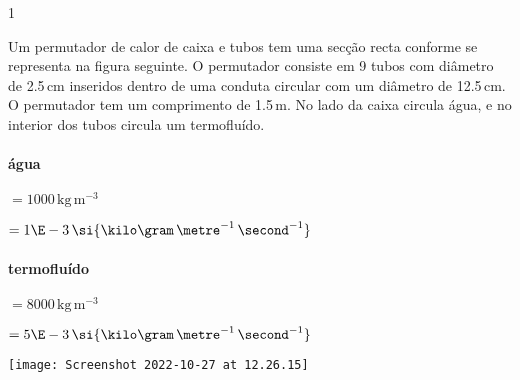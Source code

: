 \documentclass[\mainfilename]{subfiles}
\begin{document}
\begin{questionBox}1{} %
    
    Um permutador de calor de caixa e tubos tem uma secção recta conforme se representa na figura seguinte. O permutador consiste em 9 tubos com diâmetro de 2.5\,\si{\centi\metre} inseridos dentro de uma conduta circular com um diâmetro de 12.5\,\si{\centi\metre}. O permutador tem um comprimento de 1.5\,\si{\metre}. No lado da caixa circula água, e no interior dos tubos circula um termofluído.

    \paragraph*{água}
    \begin{minipage}{.5\textwidth}
        \begin{description}
            \begin{multicols}{2}
                \item[\chemrho] \(= 1000\,\si{\kilo\gram\,\metre^{-3}}\) 
                \item[\chemmu] \(= 1\E-3\,\si{\kilo\gram\,\metre^{-1}\,\second^{-1}}\) 
            \end{multicols}
        \end{description}
    \end{minipage}

    \paragraph*{termofluído}
    \begin{minipage}{.5\textwidth}
        \begin{description}
            \begin{multicols}{2}
                \item[\chemrho] \(=8000\,\si{\kilo\gram\,\metre^{-3}}\) 
                \item[\chemmu] \(=5\E-3\,\si{\kilo\gram\,\metre^{-1}\,\second^{-1}}\) 
            \end{multicols}
        \end{description}
    \end{minipage}

    \begin{center}
        \texttt{[image: Screenshot 2022-10-27 at 12.26.15]}
    \end{center}
    
\end{questionBox}
\end{document}
